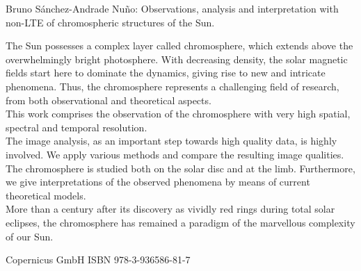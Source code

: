 \documentclass{article}
\begin{document}
\newpage

\null\vspace{-5cm}

\hspace*{-1.2cm}\colorbox{bcol}{\parbox[b][22cm][c]{15.2cm}{\null\hfill}}

\vspace{-19.4cm}

\hspace*{7mm}\begin{minipage}[t][17.5cm]{12cm}

\fontsize{12}{15}\selectfont

\textcolor{acol}{Bruno S\'anchez-Andrade Nu\~no: Observations, analysis and interpretation with non-LTE of chromospheric structures of the Sun. }

\vspace{0.5cm}

\fontsize{12}{15}\selectfont

\textcolor{scol}{The Sun possesses a complex layer called chromosphere, which extends above the overwhelmingly bright photosphere. With decreasing density, the solar magnetic fields start here to dominate the dynamics, giving rise to new and intricate phenomena. Thus, the chromosphere represents a challenging field of research, from both observational and theoretical aspects.\\
This work comprises the observation of the chromosphere with very high spatial, spectral and temporal resolution. \\ The image analysis, as an important step towards high quality data, is highly involved. We apply various methods and compare the resulting image qualities.\\ The chromosphere is studied both on the solar disc and at the limb. Furthermore, we give interpretations of the observed phenomena by means of current theoretical models.\\
More than a century after its discovery as vividly red rings during total solar eclipses, the chromosphere has remained a paradigm of the marvellous complexity of our Sun.
}

\vfill

\textcolor{scol}{Copernicus GmbH \hfill ISBN 978-3-936586-81-7}

\end{minipage}

\newpage

\null\vspace{-5cm}

\hspace*{-1.2cm}\colorbox{bcol}{\parbox[b][22cm][c]{15.2cm}{\null\hfill}}

\fontsize{12}{15}\selectfont

\vspace{-21cm}

\hspace*{6cm}
\end{document}
